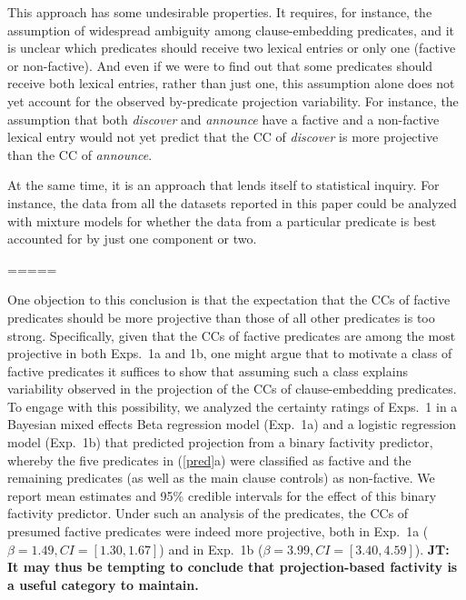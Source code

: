 \documentclass[11pt,fleqn]{article}
\newcommand{\6}{\mbox{$[\hspace*{-.6mm}[$}}
\newcommand{\9}{\mbox{$]\hspace*{-.6mm}]$}}
\newcommand{\jt}[1]{\textbf{\color{blue}JT: #1}}
\begin{document}
This approach has some undesirable properties. It requires, for instance, the assumption of widespread ambiguity among clause-embedding predicates, and it is unclear which predicates should receive two lexical entries or only one (factive or non-factive). And even if we were to find out that some predicates should receive both lexical entries, rather than just one, this assumption alone does not yet account for the observed by-predicate projection variability. For instance, the assumption that both {\em discover} and {\em announce} have a factive and a non-factive lexical entry would not yet predict that the CC of {\em discover} is more projective than the CC of {\em announce}. 

At the same time, it is an approach that lends itself to statistical inquiry. For instance, the data from all the datasets reported in this paper could be analyzed with mixture models for whether the data from a particular predicate is best accounted for by just one component or two. 


=====

One objection to this conclusion is that the expectation that the CCs of factive predicates should be more projective than those of all other predicates is too strong. Specifically, given that the CCs of factive predicates are among the most projective in both Exps.~1a and 1b, one might argue that to motivate a class of factive predicates it suffices to show that assuming such a class explains  variability observed in the projection of the CCs of clause-embedding predicates. To engage with this possibility, we analyzed the certainty ratings of Exps.~1 in a Bayesian mixed effects Beta regression model (Exp.~1a) and a logistic regression model (Exp.~1b) that predicted projection from a binary factivity predictor, whereby the five predicates in (\ref{pred}a) were classified as factive and the remaining predicates (as well as the main clause controls) as non-factive. We report mean estimates and 95\% credible intervals for the effect of this binary factivity predictor. Under such an analysis of the predicates, the CCs of presumed factive predicates were indeed more projective, both in Exp.~1a ($\beta = 1.49, CI = [1.30, 1.67]$) and in Exp.~1b ($\beta = 3.99, CI = [3.40,4.59]$). \jt{It may thus be tempting to conclude that projection-based factivity is a useful category to maintain.}
\end{document}
